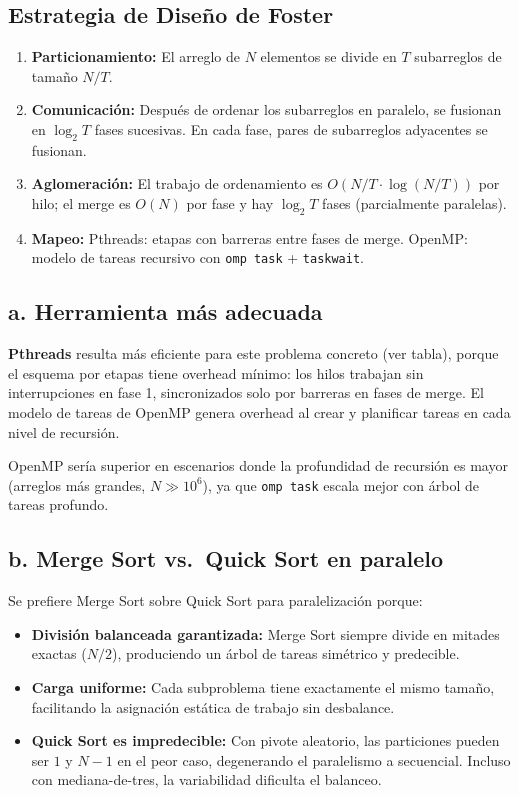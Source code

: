 \documentclass[11pt,a4paper]{article}
\begin{document}
\subsection*{Estrategia de Diseño de Foster}
\begin{enumerate}
    \item \textbf{Particionamiento:} El arreglo de $N$ elementos se divide en $T$ subarreglos de tamaño $N/T$.
    \item \textbf{Comunicación:} Después de ordenar los subarreglos en paralelo, se fusionan en $\log_2 T$ fases sucesivas. En cada fase, pares de subarreglos adyacentes se fusionan.
    \item \textbf{Aglomeración:} El trabajo de ordenamiento es $O(N/T \cdot \log(N/T))$ por hilo; el merge es $O(N)$ por fase y hay $\log_2 T$ fases (parcialmente paralelas).
    \item \textbf{Mapeo:} Pthreads: etapas con barreras entre fases de merge. OpenMP: modelo de tareas recursivo con \texttt{omp task} + \texttt{taskwait}.
\end{enumerate}

\subsection*{a. Herramienta más adecuada}
\textbf{Pthreads} resulta más eficiente para este problema concreto (ver tabla), porque el esquema por etapas tiene overhead mínimo: los hilos trabajan sin interrupciones en fase 1, sincronizados solo por barreras en fases de merge. El modelo de tareas de OpenMP genera overhead al crear y planificar tareas en cada nivel de recursión.

OpenMP sería superior en escenarios donde la profundidad de recursión es mayor (arreglos más grandes, $N \gg 10^6$), ya que \texttt{omp task} escala mejor con árbol de tareas profundo.

\subsection*{b. Merge Sort vs.\ Quick Sort en paralelo}

Se prefiere Merge Sort sobre Quick Sort para paralelización porque:
\begin{itemize}
    \item \textbf{División balanceada garantizada:} Merge Sort siempre divide en mitades exactas ($N/2$), produciendo un árbol de tareas simétrico y predecible.
    \item \textbf{Carga uniforme:} Cada subproblema tiene exactamente el mismo tamaño, facilitando la asignación estática de trabajo sin desbalance.
    \item \textbf{Quick Sort es impredecible:} Con pivote aleatorio, las particiones pueden ser $1$ y $N-1$ en el peor caso, degenerando el paralelismo a secuencial. Incluso con mediana-de-tres, la variabilidad dificulta el balanceo.
\end{itemize}
\end{document}

